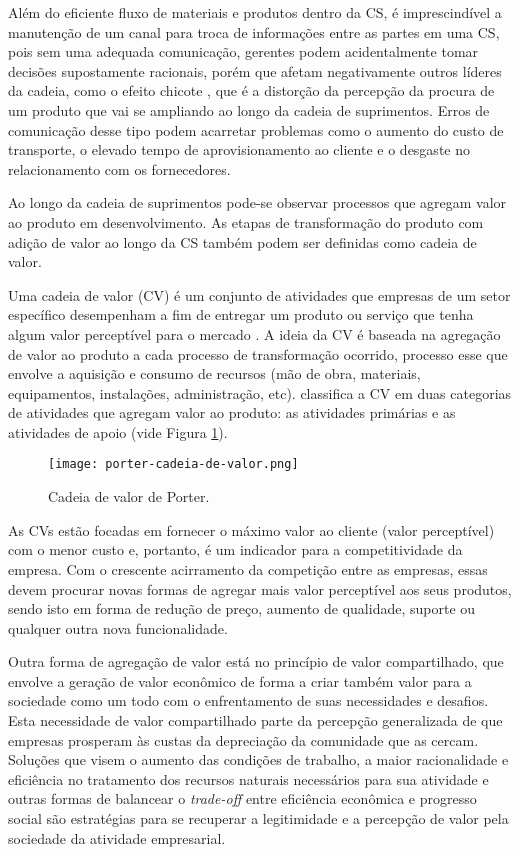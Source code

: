 	Além do eficiente fluxo de materiais e produtos dentro da CS, é imprescindível a manutenção de um canal para troca de informações entre as partes em uma CS, pois sem uma adequada comunicação, gerentes podem acidentalmente tomar decisões supostamente racionais, porém que afetam negativamente outros líderes da cadeia, como o efeito chicote \cite{lee1997bullwhip}, que é a distorção da percepção da procura de um produto que vai se ampliando ao longo da cadeia de suprimentos. Erros de comunicação desse tipo podem acarretar problemas como o aumento do custo de transporte, o elevado tempo de aprovisionamento ao cliente e o desgaste no relacionamento com os fornecedores.
	
	Ao longo da cadeia de suprimentos pode-se observar processos que agregam valor ao produto em desenvolvimento. As etapas de transformação do produto com adição de valor ao longo da CS também podem ser definidas como cadeia de valor.
	
	Uma cadeia de valor (CV) é um conjunto de atividades que empresas de um setor específico desempenham a fim de entregar um produto ou serviço que tenha algum valor perceptível para o mercado \cite{porter1985competitiveadvantage}. A ideia da CV é baseada na agregação de valor ao produto a cada processo de transformação ocorrido, processo esse que envolve a aquisição e consumo de recursos (mão de obra, materiais, equipamentos, instalações, administração, etc).  classifica a CV em duas categorias de atividades que agregam valor ao produto: as atividades primárias e as atividades de apoio (vide Figura \ref{fig:porter-cadeia-de-valor}).
	
	\begin{figure}[hbt!]
		\centering
		\caption{Cadeia de valor de Porter.}
		\texttt{[image: porter-cadeia-de-valor.png]}
		\label{fig:porter-cadeia-de-valor}
	\end{figure}
	
	
	As CVs estão focadas em fornecer o máximo valor ao cliente (valor perceptível) com o menor custo e, portanto, é um indicador para a competitividade da empresa. Com o crescente acirramento da competição entre as empresas, essas devem procurar novas formas de agregar mais valor perceptível aos seus produtos, sendo isto em forma de redução de preço, aumento de qualidade, suporte ou qualquer outra nova funcionalidade.
	
	Outra forma de agregação de valor está no princípio de valor compartilhado, que envolve a geração de valor econômico de forma a criar também valor para a sociedade como um todo \cite{porter2011valorcompartilhado} com o enfrentamento de suas necessidades e desafios. Esta necessidade de valor compartilhado parte da percepção generalizada de que empresas prosperam às custas da depreciação da comunidade que as cercam. Soluções que visem o aumento das condições de trabalho, a maior racionalidade e eficiência no tratamento dos recursos naturais necessários para sua atividade e outras formas de balancear o \textit{trade-off} entre eficiência econômica e progresso social são estratégias para se recuperar a legitimidade e a percepção de valor pela sociedade da atividade empresarial.
	
